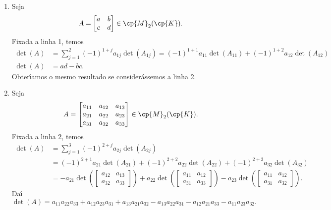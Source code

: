 \begin{exemplo}
	\begin{enumerate}[label={\arabic*})]
		\item Seja
		\[
			A =
			\begin{bmatrix}
				a & b\\
				c & d
			\end{bmatrix} \in \cp{M}_2(\cp{K}).
		\]
		Fixada a linha 1, temos
		\begin{align*}
			\det(A) &= \sum_{j = 1}^2(-1)^{1 + j}a_{1j}\det(A_{1j}) = (-1)^{1 + 1}a_{11}\det(A_{11}) + (-1)^{1 + 2}a_{12}\det(A_{12})\\
			\det(A) &= ad - bc.
	    \end{align*}
		Obter{\'\i}amos o mesmo resultado se considerássemos a linha 2.

		\item Seja
		\[
			A =
			\begin{bmatrix}
				a_{11} & a_{12} & a_{13}\\
				a_{21} & a_{22} & a_{23}\\
				a_{31} & a_{32} & a_{33}
			\end{bmatrix} \in \cp{M}_2(\cp{K}).
		\]
		Fixada a linha 2, temos
		\begin{align*}
			\det(A) &= \sum_{j = 1}^3(-1)^{2 + j}a_{2j}\det(A_{2j}) \\ &= (-1)^{2 + 1}a_{21}\det(A_{21}) + (-1)^{2 + 2}a_{22}\det(A_{22}) + (-1)^{2 + 3}a_{32}\det(A_{32})\\ &= -a_{21}\det\left(\begin{bmatrix}a_{12} & a_{13}\\a_{32} & a_{33}\end{bmatrix}\right) + a_{22}\det\left(\begin{bmatrix}a_{11} & a_{12}\\a_{31} & a_{33}\end{bmatrix}\right) - a_{23}\det\left(\begin{bmatrix}a_{11} & a_{12}\\a_{31} & a_{32}\end{bmatrix}\right).
		\end{align*}
		Da{\'\i}
		\[
			\det(A) = a_{11}a_{22}a_{33} + a_{12}a_{23}a_{31} + a_{13}a_{21}a_{32} - a_{13}a_{22}a_{31} - a_{12}a_{21}a_{33} - a_{11}a_{23}a_{32}.
		\]


\end{enumerate}
\end{exemplo}
